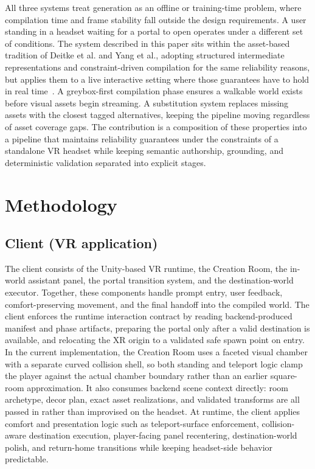\documentclass[12pt]{article}
\begin{document}
All three systems treat generation as an offline or training-time problem, where compilation time and frame stability fall outside the design requirements. A user standing in a headset waiting for a portal to open operates under a different set of conditions. The system described in this paper sits within the asset-based tradition of Deitke et al. and Yang et al., adopting structured intermediate representations and constraint-driven compilation for the same reliability reasons, but applies them to a live interactive setting where those guarantees have to hold in real time~\cite{Deitke_2022_NeurIPS, Yang_2024_CVPR}. A greybox-first compilation phase ensures a walkable world exists before visual assets begin streaming. A substitution system replaces missing assets with the closest tagged alternatives, keeping the pipeline moving regardless of asset coverage gaps. The contribution is a composition of these properties into a pipeline that maintains reliability guarantees under the constraints of a standalone VR headset while keeping semantic authorship, grounding, and deterministic validation separated into explicit stages.

\section{Methodology}
\subsection{Client (VR application)}
The client consists of the Unity-based VR runtime, the Creation Room, the in-world assistant panel, the portal transition system, and the destination-world executor. Together, these components handle prompt entry, user feedback, comfort-preserving movement, and the final handoff into the compiled world. The client enforces the runtime interaction contract by reading backend-produced manifest and phase artifacts, preparing the portal only after a valid destination is available, and relocating the XR origin to a validated safe spawn point on entry. In the current implementation, the Creation Room uses a faceted visual chamber with a separate curved collision shell, so both standing and teleport logic clamp the player against the actual chamber boundary rather than an earlier square-room approximation. It also consumes backend scene context directly: room archetype, decor plan, exact asset realizations, and validated transforms are all passed in rather than improvised on the headset. At runtime, the client applies comfort and presentation logic such as teleport-surface enforcement, collision-aware destination execution, player-facing panel recentering, destination-world polish, and return-home transitions while keeping headset-side behavior predictable.
\end{document}

